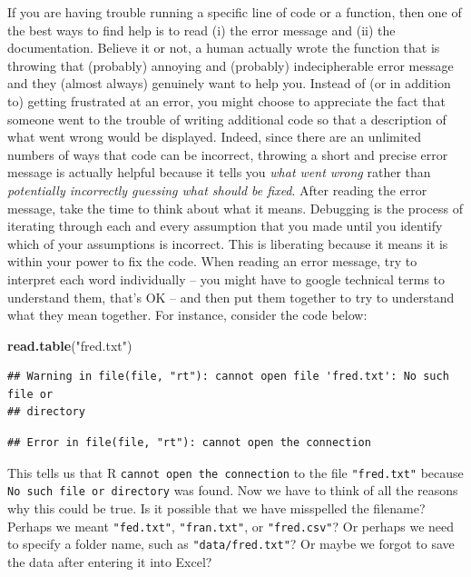 \documentclass[]{book}
\newenvironment{Shaded}{\begin{snugshade}}{\end{snugshade}}
\newcommand{\KeywordTok}[1]{\textcolor[rgb]{0.13,0.29,0.53}{\textbf{#1}}}
\newcommand{\StringTok}[1]{\textcolor[rgb]{0.31,0.60,0.02}{#1}}
\newcommand{\NormalTok}[1]{#1}
\begin{document}
If you are having trouble running a specific line of code or a function,
then one of the best ways to find help is to read (i) the error message
and (ii) the documentation. Believe it or not, a human actually wrote
the function that is throwing that (probably) annoying and (probably)
indecipherable error message and they (almost always) genuinely want to
help you. Instead of (or in addition to) getting frustrated at an error,
you might choose to appreciate the fact that someone went to the trouble
of writing additional code so that a description of what went wrong
would be displayed. Indeed, since there are an unlimited numbers of ways
that code can be incorrect, throwing a short and precise error message
is actually helpful because it tells you \emph{what went wrong} rather
than \emph{potentially incorrectly guessing what should be fixed}. After
reading the error message, take the time to think about what it means.
Debugging is the process of iterating through each and every assumption
that you made until you identify which of your assumptions is incorrect.
This is liberating because it means it is within your power to fix the
code. When reading an error message, try to interpret each word
individually -- you might have to google technical terms to understand
them, that's OK -- and then put them together to try to understand what
they mean together. For instance, consider the code below:

\begin{Shaded}
\begin{Highlighting}[]
\KeywordTok{read.table}\NormalTok{(}\StringTok{"fred.txt"}\NormalTok{)}
\end{Highlighting}
\end{Shaded}

\begin{verbatim}
## Warning in file(file, "rt"): cannot open file 'fred.txt': No such file or
## directory
\end{verbatim}

\begin{verbatim}
## Error in file(file, "rt"): cannot open the connection
\end{verbatim}

This tells us that R \texttt{cannot\ open\ the\ connection} to the file
\texttt{"fred.txt"} because \texttt{No\ such\ file\ or\ directory} was
found. Now we have to think of all the reasons why this could be true.
Is it possible that we have misspelled the filename? Perhaps we meant
\texttt{"fed.txt"}, \texttt{"fran.txt"}, or \texttt{"fred.csv"}? Or
perhaps we need to specify a folder name, such as
\texttt{"data/fred.txt"}? Or maybe we forgot to save the data after
entering it into Excel?
\end{document}

